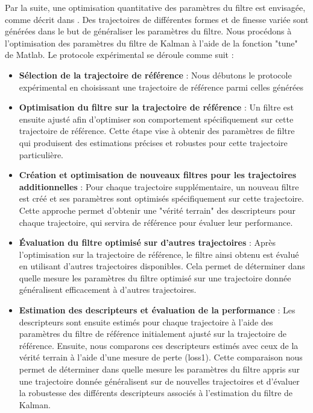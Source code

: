\documentclass[5pt]{article}
\begin{document}
Par la suite, une optimisation quantitative des paramètres du filtre est envisagée, comme décrit dans \cite{abbeel_discriminative_2005}. Des trajectoires de différentes formes et de finesse variée sont générées dans le but de généraliser les paramètres du filtre. Nous procédons à l'optimisation des paramètres du filtre de Kalman à l'aide de la fonction "tune" de Matlab. Le protocole expérimental se déroule comme suit : \begin{itemize}
    \item \textbf{Sélection de la trajectoire de référence} : Nous débutons le protocole expérimental en choisissant une trajectoire de référence parmi celles générées
        
    \item \textbf{Optimisation du filtre sur la trajectoire de référence} : Un filtre est ensuite ajusté afin d'optimiser son comportement spécifiquement sur cette trajectoire de référence. Cette étape vise à obtenir des paramètres de filtre qui produisent des estimations précises et robustes pour cette trajectoire particulière.
        
    \item \textbf{Création et optimisation de nouveaux filtres pour les trajectoires additionnelles} : Pour chaque trajectoire supplémentaire, un nouveau filtre est créé et ses paramètres sont optimisés spécifiquement sur cette trajectoire. Cette approche permet d'obtenir une "vérité terrain" des descripteurs pour chaque trajectoire, qui servira de référence pour évaluer leur performance.
       
    \item \textbf{Évaluation du filtre optimisé sur d'autres trajectoires} : Après l'optimisation sur la trajectoire de référence, le filtre ainsi obtenu est évalué en utilisant d'autres trajectoires disponibles. Cela permet de déterminer dans quelle mesure les paramètres du filtre optimisé sur une trajectoire donnée généralisent efficacement à d'autres trajectoires.
    
    \item \textbf{Estimation des descripteurs et évaluation de la performance} : Les descripteurs sont ensuite estimés pour chaque trajectoire à l'aide des paramètres du filtre de référence initialement ajusté sur la trajectoire de référence. Ensuite, nous comparons ces descripteurs estimés avec ceux de la vérité terrain à l'aide d'une mesure de perte (loss1). Cette comparaison nous permet de déterminer dans quelle mesure les paramètres du filtre appris sur une trajectoire donnée généralisent sur de nouvelles trajectoires et d'évaluer la robustesse des différents descripteurs associés à l'estimation du filtre de Kalman.
\end{itemize}
\end{document}

